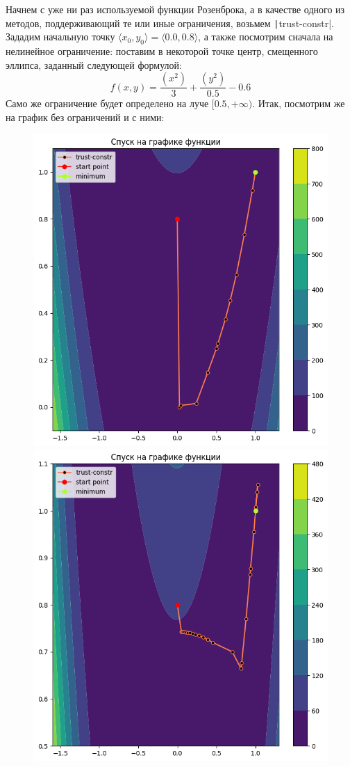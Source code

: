 \documentclass[12pt, a4paper, oneside, final]{article}
\begin{document}
	Начнем с уже ни раз используемой функции Розенброка, а в качестве одного из методов, поддерживающий те или иные ограничения, возьмем \texttt|trust-constr|.
	Зададим начальную точку $\langle x_0, y_0 \rangle = \langle 0.0, 0.8 \rangle$, а также посмотрим сначала на нелинейное ограничение: поставим в некоторой точке центр, смещенного эллипса, заданный следующей формулой:
	\[
		f(x, y) = \dfrac{\left(x^2\right)}{3} + \dfrac{\left(y^2\right)}{0.5} - 0.6
	\]
	Само же ограничение будет определено на луче $[0.5, +\infty)$.
	Итак, посмотрим же на график без ограничений и с ними:
	\begin{figure}[H]
		\centering
		\includegraphics[scale = 0.475]{Image/AT_ROSEN_NO_CONSTRAINT.png}
		\includegraphics[scale = 0.475]{Image/AT_ROSEN_NONLINEAR_CONSTRAINT.png}

\end{figure}
\end{document}
